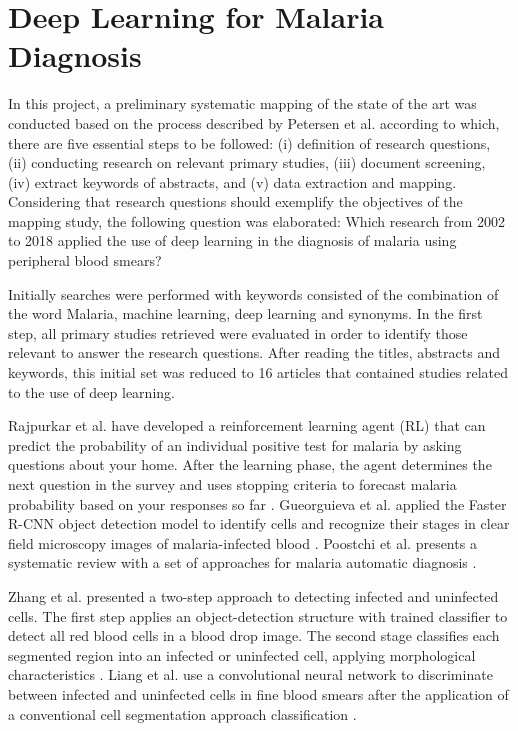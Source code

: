 \section{Deep Learning for Malaria Diagnosis}

In this project, a preliminary systematic mapping of the state of the art was conducted based on the process described by Petersen et al. \cite{Petersen2015} according to which, there are five essential steps to be followed: (i) definition of research questions, (ii) conducting research on relevant primary studies, (iii) document screening, (iv) extract keywords of abstracts, and (v) data extraction and mapping. Considering that research questions should exemplify the objectives of the mapping study, the following question was elaborated: Which research from 2002 to 2018 applied the use of deep learning in the diagnosis of malaria using peripheral blood smears?

Initially searches were performed with keywords consisted of the combination of the word Malaria, machine learning, deep learning and synonyms. In the first step, all primary studies retrieved were evaluated in order to identify those relevant to answer the research questions. After reading the titles, abstracts and keywords, this initial set was reduced to 16 articles that contained studies related to the use of deep learning.

Rajpurkar et al. have developed a reinforcement learning agent (RL) that can predict the probability of an individual positive test for malaria by asking questions about your home. After the learning phase, the agent determines the next question in the survey and uses stopping criteria to forecast malaria probability based on your responses so far \cite{Rajpurkar2017}. Gueorguieva et al. applied the Faster R-CNN object detection model to identify cells and recognize their stages in clear field microscopy images of malaria-infected blood \cite{hung2017applying}. Poostchi et al. presents a systematic review with a set of approaches for malaria automatic diagnosis \cite{Poostchi2018}.


Zhang et al. presented a two-step approach to detecting infected and uninfected cells. The first step applies an object-detection structure with trained classifier to detect all red blood cells in a blood drop image. The second stage classifies each segmented region into an infected or uninfected cell, applying morphological characteristics \cite{Zhang2016}. Liang et al. use a convolutional neural network to discriminate between infected and uninfected cells in fine blood smears after the application of a conventional cell segmentation approach classification \cite{Liang2017}.

